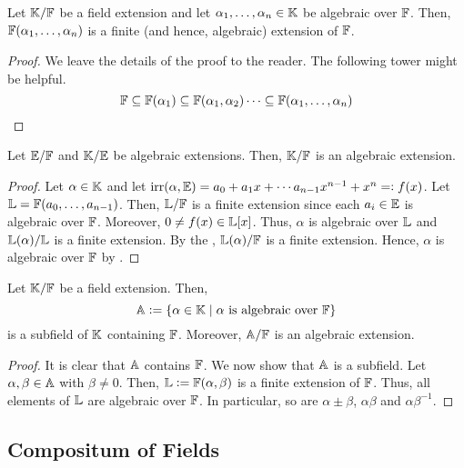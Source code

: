 \begin{prop} \label{prop:field-generated-by-algebraic-is-finite-extension}
Let $\mathbb{K}/\mathbb{F}$ be a field extension and let $\alpha_1, \ldots, \alpha_n \in \mathbb{K}$ be algebraic over $\mathbb{F}$. Then, $\mathbb{F}(\alpha_1, \ldots, \alpha_n)$ is a finite (and hence, algebraic) extension of $\mathbb{F}$.
\end{prop}
\begin{proof}
    We leave the details of the proof to the reader. The following tower might be helpful. 
    \[
        \mathbb{F} \subseteq \mathbb{F}(\alpha_1) \subseteq \mathbb{F}(\alpha_1, \alpha_2) \cdots \subseteq \mathbb{F}(\alpha_1, \ldots, \alpha_n) \qedhere
    \]
\end{proof}

\begin{cor} \label{cor:algebraic-transitive}
    Let $\mathbb{E}/\mathbb{F}$ and $\mathbb{K}/\mathbb{E}$ be algebraic extensions. Then, $\mathbb{K}/\mathbb{F}$ is an algebraic extension. 
\end{cor}
\begin{proof}
    Let $\alpha \in \mathbb{K}$ and let $\operatorname{irr}(\alpha,\mathbb{E}) = a_0 + a_1x+ \cdots a_{n-1}x^{n-1} + x^n =\vcentcolon f(x)$. Let $\mathbb{L} = \mathbb{F}(a_0, \ldots, a_{n-1})$. Then, $\mathbb{L}/\mathbb{F}$ is a finite extension since each $a_i \in \mathbb{E}$ is algebraic over $\mathbb{F}$. Moreover, $0 \neq f(x) \in \mathbb{L}[x]$. Thus, $\alpha$ is algebraic over $\mathbb{L}$ and $\mathbb{L}(\alpha)/\mathbb{L}$ is a finite extension. By the , $\mathbb{L}(\alpha)/\mathbb{F}$ is a finite extension. Hence, $\alpha$ is algebraic over $\mathbb{F}$ by . 
\end{proof}

\begin{cor} \label{cor:A/F-is-algebraic}
Let $\mathbb{K}/\mathbb{F}$ be a field extension. Then, 
\[
    \mathbb{A} \vcentcolon= \left\{ \alpha \in \mathbb{K} \mid \alpha \text{ is algebraic over } \mathbb{F} \right\}
\]
is a subfield of $\mathbb{K}$ containing $\mathbb{F}$. Moreover, $\mathbb{A}/\mathbb{F}$ is an algebraic extension.
\end{cor}
\begin{proof}
    It is clear that $\mathbb{A}$ contains $\mathbb{F}$. We now show that $\mathbb{A}$ is a subfield. Let $\alpha, \beta \in \mathbb{A}$ with $\beta \neq 0$. Then, $\mathbb{L} \vcentcolon= \mathbb{F}(\alpha, \beta)$ is a finite extension of $\mathbb{F}$. Thus, all elements of $\mathbb{L}$ are algebraic over $\mathbb{F}$. In particular, so are $\alpha \pm \beta$, $\alpha \beta$ and $\alpha \beta^{-1}$.
\end{proof}

\subsection{Compositum of Fields}

